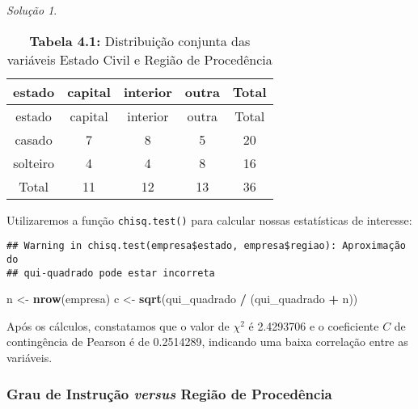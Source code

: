\documentclass[
]{latex/krantz}
\newenvironment{Shaded}{\begin{snugshade}}{\end{snugshade}}
\newcommand{\DecValTok}[1]{\textcolor[rgb]{0.00,0.00,0.81}{#1}}
\newcommand{\FunctionTok}[1]{\textcolor[rgb]{0.13,0.29,0.53}{\textbf{#1}}}
\newcommand{\NormalTok}[1]{#1}
\newcommand{\OtherTok}[1]{\textcolor[rgb]{0.56,0.35,0.01}{#1}}
\newcommand{\SpecialCharTok}[1]{\textcolor[rgb]{0.81,0.36,0.00}{\textbf{#1}}}
\theoremstyle{definition}
\theoremstyle{definition}
\theoremstyle{definition}
\theoremstyle{definition}
\theoremstyle{remark}
\newtheorem*{solution}{Solução}
\begin{document}
\begin{solution}
\begin{longtable}[]{@{}ccccc@{}}
\caption{\textbf{Tabela 4.1:} Distribuição conjunta das variáveis Estado Civil e Região de Procedência}\tabularnewline
\toprule\noalign{}
estado & capital & interior & outra & Total \\
\midrule\noalign{}
\endfirsthead
\toprule\noalign{}
estado & capital & interior & outra & Total \\
\midrule\noalign{}
\endhead
\bottomrule\noalign{}
\endlastfoot
casado & 7 & 8 & 5 & 20 \\
solteiro & 4 & 4 & 8 & 16 \\
Total & 11 & 12 & 13 & 36 \\
\end{longtable}

Utilizaremos a função \texttt{chisq.test()} para calcular nossas estatísticas de interesse:

\begin{Shaded}
\end{Shaded}

\begin{verbatim}
## Warning in chisq.test(empresa$estado, empresa$regiao): Aproximação do
## qui-quadrado pode estar incorreta
\end{verbatim}

\begin{Shaded}
\begin{Highlighting}[]
\NormalTok{n }\OtherTok{\textless{}{-}} \FunctionTok{nrow}\NormalTok{(empresa)}
\NormalTok{c }\OtherTok{\textless{}{-}} \FunctionTok{sqrt}\NormalTok{(qui\_quadrado }\SpecialCharTok{/}\NormalTok{ (qui\_quadrado }\SpecialCharTok{+}\NormalTok{ n))}
\end{Highlighting}
\end{Shaded}

Após os cálculos, constatamos que o valor de \(\chi^2\) é 2.4293706 e o coeficiente \(C\) de contingência de Pearson é de 0.2514289, indicando uma baixa correlação entre as variáveis.

\hypertarget{grau-de-instruuxe7uxe3o-versus-regiuxe3o-de-proceduxeancia}{%
\subsubsection*{\texorpdfstring{Grau de Instrução \emph{versus} Região de Procedência}{Grau de Instrução versus Região de Procedência}}\label{grau-de-instruuxe7uxe3o-versus-regiuxe3o-de-proceduxeancia}}


\end{solution}
\end{document}
